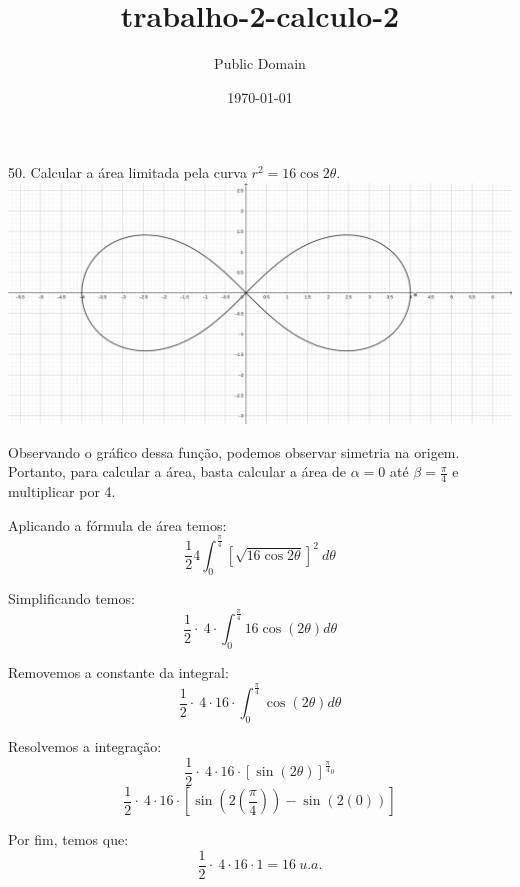 \documentclass[a4paper,times,12pt]{article}
\title{trabalho-2-calculo-2}
\author{Public Domain}
\date{\today}
\begin{document}
\hspace*{+15pt} 50. Calcular a área limitada pela curva \( r^{2} = 16 \cos{2 \theta} \).
\\
\includegraphics[width=\textwidth]{geogebra-export}
\\
\par Observando o gráfico dessa função, podemos observar simetria na origem. Portanto, para calcular a área, basta calcular a área de \( \alpha = 0 \) até \( \beta = \frac{\pi}{4} \) e multiplicar por 4.
\\
\par Aplicando a fórmula de área temos:
\[
	\frac{1}{2}4\int _0^{\frac{\pi }{4}}\left[\sqrt{16\cos 2\theta }\right]^2\:d\theta
\]
\par Simplificando temos:
\[
	\frac{1}{2}\cdot \:4\cdot \int _0^{\frac{\pi }{4}}16\cos \left(2\theta\right)d\theta
\]
\par Removemos a constante da integral:
\[
	\frac{1}{2}\cdot \:4\cdot 16\cdot \int _0^{\frac{\pi }{4}}\cos \left(2\theta\right)d\theta
\]
\par Resolvemos a integração:
\[
	\frac{1}{2}\cdot \:4\cdot 16\cdot\left[\sin \left(2\theta\right)\right]^{\frac{\pi }{4}_{0}}
\]
\[
	\frac{1}{2}\cdot \:4\cdot 16\cdot\left[\sin \left(2\left(\frac{\pi}{4}\right)\right)-\sin \left(2\left(0\right)\right)\right]
\]
\par Por fim, temos que:
\[
	\frac{1}{2}\cdot \:4\cdot 16\cdot1 = 16\ u.a.
\]
\end{document}

